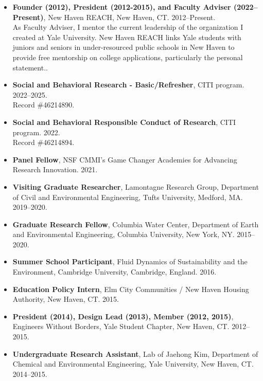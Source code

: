 \documentclass[10pt,oneside]{article}
\begin{document}
\begin{itemize}[label={}]
  
  \item \textbf{Founder (2012), President (2012-2015), and Faculty Adviser (2022--Present)}, New Haven REACH, New Haven, CT. 2012--Present.\\As Faculty Adviser, I mentor the current leadership of the organization I created at Yale University. New Haven REACH links Yale students with juniors and seniors in under-resourced public schools in New Haven to provide free mentorship on college applications, particularly the personal statement..
  
  \item \textbf{Social and Behavioral Research - Basic/Refresher}, CITI program. 2022--2025.\\Record \#46214890.
  
  \item \textbf{Social and Behavioral Responsible Conduct of Research}, CITI program. 2022.\\Record \#46214894.
  
  \item \textbf{Panel Fellow}, NSF CMMI's Game Changer Academies for Advancing Research Innovation. 2021.
  
  \item \textbf{Visiting Graduate Researcher}, Lamontagne Research Group, Department of Civil and Environmental Engineering, Tufts University, Medford, MA. 2019--2020.
  
  \item \textbf{Graduate Research Fellow}, Columbia Water Center, Department of Earth and Environmental Engineering, Columbia University, New York, NY. 2015--2020.
  
  \item \textbf{Summer School Participant}, Fluid Dynamics of Sustainability and the Environment, Cambridge University, Cambridge, England. 2016.
  
  \item \textbf{Education Policy Intern}, Elm City Communities / New Haven Housing Authority, New Haven, CT. 2015.
  
  \item \textbf{President (2014), Design Lead (2013), Member (2012, 2015)}, Engineers Without Borders, Yale Student Chapter, New Haven, CT. 2012--2015.
  
  \item \textbf{Undergraduate Research Assistant}, Lab of Jaehong Kim, Department of Chemical and Environmental Engineering, Yale University, New Haven, CT. 2014--2015.
  

\end{itemize}
\end{document}
